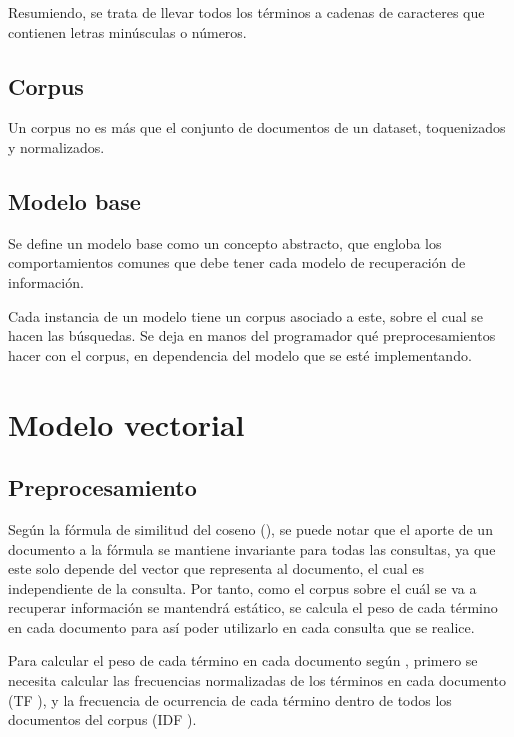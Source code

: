 \documentclass{llncs}
\begin{document}
	Resumiendo, se trata de llevar todos los t\'erminos a cadenas de caracteres que contienen letras min\'usculas o n\'umeros.
	
	\subsection{Corpus}
	
	Un corpus no es más que el conjunto de documentos de un dataset, toquenizados y normalizados.
	
	\subsection{Modelo base}
	
	Se define un modelo base como un concepto abstracto, que engloba los comportamientos comunes que debe tener cada modelo de recuperaci\'on de informaci\'on. 
	
	Cada instancia de un modelo tiene un corpus asociado a este, sobre el cual se hacen las b\'usquedas. Se deja en manos del programador qu\'e preprocesamientos hacer con el corpus, en dependencia del modelo que se est\'e implementando. 
	
	\section{Modelo vectorial}
	
	\subsection{Preprocesamiento}
	
	Seg\'un la f\'ormula de similitud del coseno (\cite[\emph{Ecuaci\'on}~(6.10)]{B1}), se puede notar que el aporte de un documento a la f\'ormula se mantiene invariante para todas las consultas, ya que este solo depende del vector que representa al documento, el cual es independiente de la consulta. Por tanto, como el corpus sobre el cu\'al se va a recuperar informaci\'on se mantendr\'a est\'atico, se calcula el peso de cada t\'ermino en cada documento para as\'i poder utilizarlo en cada consulta que se realice.
	
	Para calcular el peso de cada t\'ermino en cada documento seg\'un \cite[Ecuaci\'on (2.3)]{B1}, primero se necesita calcular las frecuencias normalizadas de los t\'erminos en cada documento (TF \cite[Ecuaci\'on (2.1)]{B2}), y la frecuencia de ocurrencia de cada t\'ermino dentro de todos los documentos del corpus (IDF \cite[Ecuaci\'on(2.2)]{B2}).
	
\end{document}
